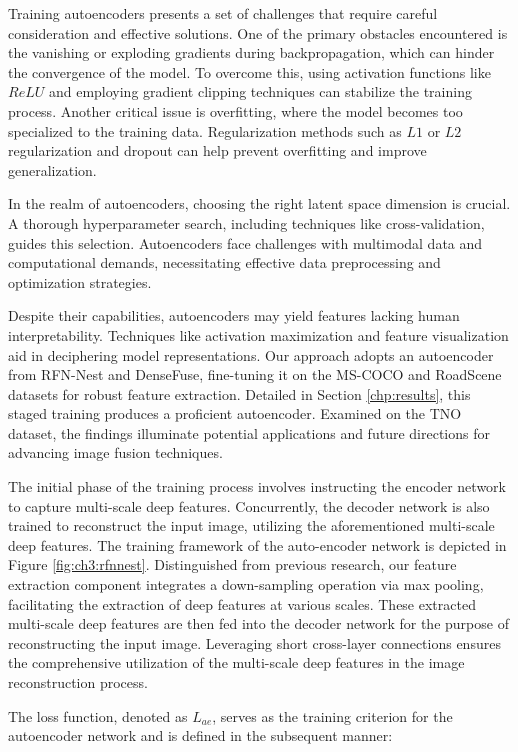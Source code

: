 Training autoencoders presents a set of challenges that require careful consideration and effective solutions. One of the primary obstacles encountered is the vanishing or exploding gradients during backpropagation, which can hinder the convergence of the model. To overcome this, using activation functions like $ReLU$ and employing gradient clipping techniques can stabilize the training process. Another critical issue is overfitting, where the model becomes too specialized to the training data. Regularization methods such as $L1$ or $L2$ regularization and dropout can help prevent overfitting and improve generalization.

In the realm of autoencoders, choosing the right latent space dimension is crucial. A thorough hyperparameter search, including techniques like cross-validation, guides this selection. Autoencoders face challenges with multimodal data and computational demands, necessitating effective data preprocessing and optimization strategies.

Despite their capabilities, autoencoders may yield features lacking human interpretability. Techniques like activation maximization and feature visualization aid in deciphering model representations. Our approach adopts an autoencoder from RFN-Nest and DenseFuse, fine-tuning it on the MS-COCO and RoadScene datasets for robust feature extraction. Detailed in Section \ref{chp:results}, this staged training produces a proficient autoencoder. Examined on the TNO dataset, the findings illuminate potential applications and future directions for advancing image fusion techniques.

The initial phase of the training process involves instructing the encoder network to capture multi-scale deep features. Concurrently, the decoder network is also trained to reconstruct the input image, utilizing the aforementioned multi-scale deep features. The training framework of the auto-encoder network is depicted in Figure \ref{fig:ch3:rfnnest}. Distinguished from previous research, our feature extraction component integrates a down-sampling operation via max pooling, facilitating the extraction of deep features at various scales. These extracted multi-scale deep features are then fed into the decoder network for the purpose of reconstructing the input image. Leveraging short cross-layer connections ensures the comprehensive utilization of the multi-scale deep features in the image reconstruction process.

The loss function, denoted as $L_{ae}$, serves as the training criterion for the autoencoder network and is defined in the subsequent manner:

